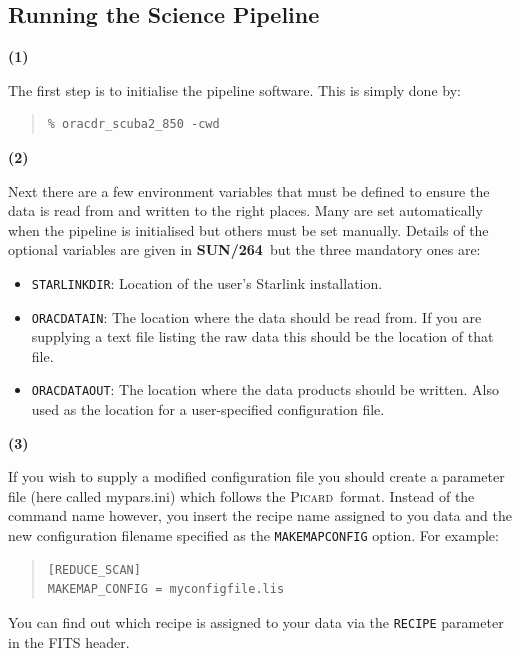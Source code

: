 \documentclass[twoside,11pt]{article}
\newcommand{\xref}[3]{#1}
\newcommand{\xlabel}[1]{}
\renewcommand{\_}{\texttt{\symbol{95}}}
\newenvironment{myquote}{\begin{quote}\begin{small}}{\end{small}\end{quote}}
\newcommand{\picard}{\xref{\textsc{Picard}}{sun265}{}}
\newcommand{\param}[1]{\texttt{#1}}
\newcommand{\pipelinesun}{\xref{\textbf{SUN/264}}{sun264}{}}
\begin{document}
\subsection{\xlabel{running_pl}Running the Science Pipeline}
\begin{minipage}[t]{0.05\linewidth}
\textbf{(1)}
\end{minipage}
\begin{minipage}[t]{0.95\linewidth}
The first step is to initialise the pipeline software. This is simply done by:
\begin{myquote}
\begin{verbatim}
% oracdr_scuba2_850 -cwd

\end{verbatim}
\end{myquote}
\end{minipage}

\begin{minipage}[t]{0.05\linewidth}
\textbf{(2)}
\end{minipage}
\begin{minipage}[t]{0.95\linewidth}
Next there are a few environment variables that must be defined to
ensure the data is read from and written to the right places. Many are
set automatically when the pipeline is initialised but others must be
set manually. Details of the optional variables are given in
\pipelinesun\ but the three mandatory ones are:
\begin{itemize}\itemsep-0.1em
\item \param{STARLINK\_DIR}: Location of the user's Starlink installation.
\item \param{ORAC\_DATA\_IN}: The location where the data should be read from.
If you are supplying a text file listing the raw data this should be the
location of that file.
\item \param{ORAC\_DATA\_OUT}: The location where the data products should be
written. Also used as the location for a user-specified configuration file.\\
\end{itemize}
\end{minipage}

\begin{minipage}[t]{0.05\linewidth}
\textbf{(3)}
\end{minipage}
\begin{minipage}[t]{0.95\linewidth}
If you wish to supply a modified configuration file you should create
a parameter file (here called mypars.ini) which follows the \picard\
format. Instead of the command name however, you insert the recipe
name assigned to you data and the new configuration filename specified
as the \texttt{MAKEMAP\_CONFIG} option. For example:
\begin{myquote}
\begin{verbatim}
[REDUCE_SCAN]
MAKEMAP_CONFIG = myconfigfile.lis
 \end{verbatim}
\end{myquote}
\end{minipage}
You can find out which recipe is assigned to your data via the
\texttt{RECIPE} parameter in the FITS header.
\end{document}
